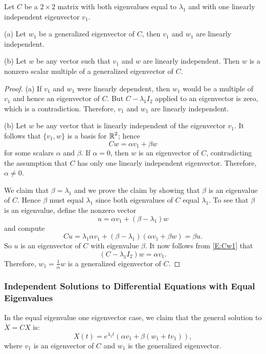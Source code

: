 \documentclass{ximera}
\begin{document}
\begin{lemma}  \label{L:geneig2}
Let $C$ be a $2\times 2$ matrix with both eigenvalues equal to $\lambda_1$
and with one linearly independent eigenvector $v_1$.  

\noindent (a)  Let $w_1$ be a generalized eigenvector of $C$, then $v_1$ and 
$w_1$ are linearly independent. 

\noindent (b)  Let $w$ be any vector such that $v_1$ and $w$ are linearly 
independent.  Then $w$ is a nonzero scalar multiple of a generalized 
eigenvector of $C$.
\end{lemma}

\begin{proof}  (a) If $v_1$ and $w_1$ were linearly dependent, then $w_1$ would be 
a multiple of $v_1$ and hence an eigenvector of $C$.  But $C-\lambda_1I_2$
applied to an eigenvector is zero, which is a contradiction.  Therefore, 
$v_1$ and $w_1$ are linearly independent.

(b) Let $w$ be any vector that is linearly independent of
the eigenvector $v_1$.  It follows that  $\{v_1,w\}$ is a basis for
$\mbox{$\Bbb{R}$}^2$; hence
\begin{equation} \label{E:Cw1}
Cw = \alpha v_1 + \beta w
\end{equation}
for some scalars $\alpha$ and $\beta$.    If $\alpha=0$, then
$w$ is an eigenvector of $C$, contradicting the assumption that $C$ has
only one linearly independent eigenvector.  Therefore, $\alpha\neq 0$.

We claim that $\beta=\lambda_1$ and we prove the claim by showing that
$\beta$ is an eigenvalue of $C$.  Hence $\beta$ must equal $\lambda_1$
since both eigenvalues of $C$ equal $\lambda_1$.  To see that $\beta$
is an eigenvalue, define the nonzero vector
\[
u = \alpha v_1 +(\beta-\lambda_1)w
\]
and compute
\[
Cu = \lambda_1 \alpha v_1 + (\beta-\lambda_1)(\alpha v_1+\beta w) =
\beta u.
\]
So $u$ is an eigenvector of $C$ with eigenvalue $\beta$.
It now follows from \eqref{E:Cw1} that
\[
(C-\lambda_1I_2)w = \alpha v_1.
\]
Therefore, $w_1=\frac{1}{\alpha}w$ is a generalized eigenvector
of $C$.  \end{proof}



\subsubsection*{Independent Solutions to Differential Equations with
Equal Eigenvalues}

In the equal eigenvalue one eigenvector case, we
claim that the general solution to $\dot{X}=CX$ is:
\begin{equation}  \label{e:exp1eva}
X(t) = e^{\lambda_1 t}\left(\alpha v_1 +\beta (w_1+tv_1)\right),
\end{equation}
where $v_1$ is an eigenvector of $C$ and $w_1$ is the generalized
eigenvector.
\end{document}
